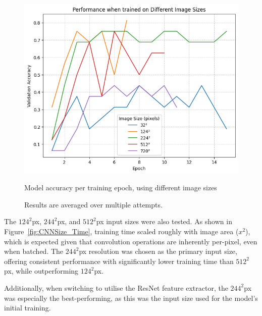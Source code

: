                         \begin{figure}[h]
                            \centering
                            \includegraphics[width=\textwidth]{images/CNNSize_Perf.png}
                            \caption{Model accuracy per training epoch, using different image sizes}
                            \label{fig:CNNSize_Perf}
                            \caption*{Results are averaged over multiple attempts.}
                        \end{figure}
    
                        The \(124^2\)px, \(244^2\)px, and \(512^2\)px input sizes were also tested. As shown in Figure~\ref{fig:CNNSize_Time}, training time scaled roughly with image area (\(x^2\)), which is expected given that convolution operations are inherently per-pixel, even when batched. The \(244^2\)px resolution was chosen as the primary input size, offering consistent performance with significantly lower training time than \(512^2\)px, while outperforming \(124^2\)px.
    
                        Additionally, when switching to utilise the ResNet feature extractor, the \(244^2\)px was especially the best-performing, as this was the input size used for the model's initial training.
                
